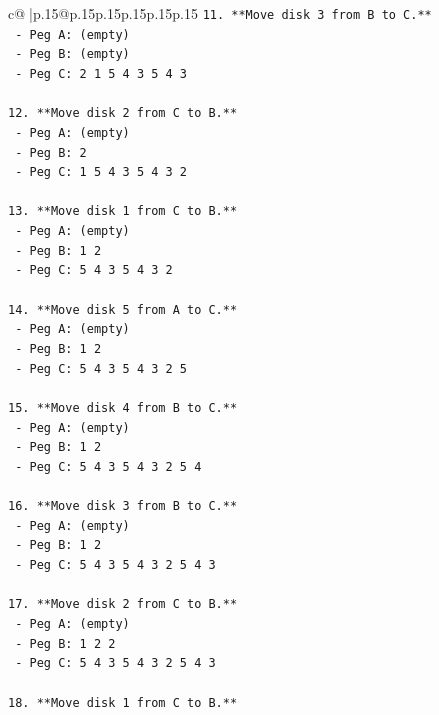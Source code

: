 \documentclass{article}
\begin{document}
{\begin{supertabular}{c@{$\;$}|p{.15\linewidth}@{}p{.15\linewidth}p{.15\linewidth}p{.15\linewidth}p{.15\linewidth}p{.15\linewidth}}
{{{\texttt{11. **Move disk 3 from B to C.**} \\
\texttt{    {-} Peg A: (empty)} \\
\texttt{    {-} Peg B: (empty)} \\
\texttt{    {-} Peg C: 2 1 5 4 3 5 4 3} \\
\\ 
\texttt{12. **Move disk 2 from C to B.**} \\
\texttt{    {-} Peg A: (empty)} \\
\texttt{    {-} Peg B: 2} \\
\texttt{    {-} Peg C: 1 5 4 3 5 4 3 2} \\
\\ 
\texttt{13. **Move disk 1 from C to B.**} \\
\texttt{    {-} Peg A: (empty)} \\
\texttt{    {-} Peg B: 1 2} \\
\texttt{    {-} Peg C: 5 4 3 5 4 3 2} \\
\\ 
\texttt{14. **Move disk 5 from A to C.**} \\
\texttt{    {-} Peg A: (empty)} \\
\texttt{    {-} Peg B: 1 2} \\
\texttt{    {-} Peg C: 5 4 3 5 4 3 2 5} \\
\\ 
\texttt{15. **Move disk 4 from B to C.**} \\
\texttt{    {-} Peg A: (empty)} \\
\texttt{    {-} Peg B: 1 2} \\
\texttt{    {-} Peg C: 5 4 3 5 4 3 2 5 4} \\
\\ 
\texttt{16. **Move disk 3 from B to C.**} \\
\texttt{    {-} Peg A: (empty)} \\
\texttt{    {-} Peg B: 1 2} \\
\texttt{    {-} Peg C: 5 4 3 5 4 3 2 5 4 3} \\
\\ 
\texttt{17. **Move disk 2 from C to B.**} \\
\texttt{    {-} Peg A: (empty)} \\
\texttt{    {-} Peg B: 1 2 2} \\
\texttt{    {-} Peg C: 5 4 3 5 4 3 2 5 4 3} \\
\\ 
\texttt{18. **Move disk 1 from C to B.**} \\
}}}
\end{supertabular}}
\end{document}

